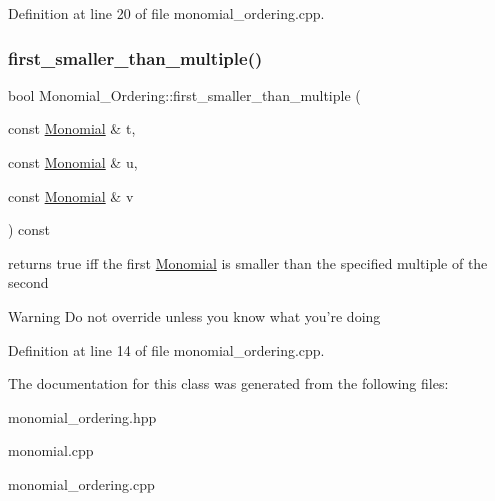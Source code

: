 Definition at line 20 of file monomial\+\_\+ordering.\+cpp.

\mbox{\label{class_monomial___ordering_aad1ca67ca89fa85e63475d24d9f0a987}} 
\subsubsection{\texorpdfstring{first\+\_\+smaller\+\_\+than\+\_\+multiple()}{first\_smaller\_than\_multiple()}}
{\footnotesize\ttfamily bool Monomial\+\_\+\+Ordering\+::first\+\_\+smaller\+\_\+than\+\_\+multiple (\begin{DoxyParamCaption}\item[{const \hyperlink{class_monomial}{Monomial} \&}]{t,  }\item[{const \hyperlink{class_monomial}{Monomial} \&}]{u,  }\item[{const \hyperlink{class_monomial}{Monomial} \&}]{v }\end{DoxyParamCaption}) const}



returns {\ttfamily true} iff the first \hyperlink{class_monomial}{Monomial} is smaller than the specified multiple of the second 

\begin{DoxyWarning}{Warning}
Do not override unless you know what you're doing 
\end{DoxyWarning}


Definition at line 14 of file monomial\+\_\+ordering.\+cpp.



The documentation for this class was generated from the following files\+:\begin{DoxyCompactItemize}
\item 
monomial\+\_\+ordering.\+hpp\item 
monomial.\+cpp\item 
monomial\+\_\+ordering.\+cpp\end{DoxyCompactItemize}
